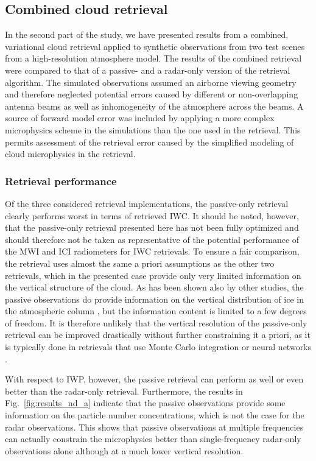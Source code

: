 \documentclass[journal abbreviation, manuscript]{copernicus}
\begin{document}
\subsection{Combined cloud retrieval}

In the second part of the study, we have presented results from a combined,
variational cloud retrieval applied to synthetic observations from two test
scenes from a high-resolution atmosphere model. The results of the combined
retrieval were compared to that of a passive- and a radar-only version of the
retrieval algorithm. The simulated observations assumed an airborne viewing
geometry and therefore neglected potential errors caused by different or
non-overlapping antenna beams as well as inhomogeneity of the atmosphere across
the beams. A source of forward model error was included by applying a more
complex microphysics scheme in the simulations than the one used in the
retrieval. This permits assessment of the retrieval error caused by the
simplified modeling of cloud microphysics in the retrieval.

\subsubsection{Retrieval performance}

Of the three considered retrieval implementations, the passive-only retrieval
clearly performs worst in terms of retrieved IWC. It should be noted, however,
that the passive-only retrieval presented here has not been fully optimized and
should therefore not be taken as representative of the potential performance of
the MWI and ICI radiometers for IWC retrievals. To ensure a fair comparison, the
retrieval uses almost the same a priori assumptions as the other two retrievals,
which in the presented case provide only very limited information on the
vertical structure of the cloud. As has been shown also by other studies, the
passive observations do provide information on the vertical distribution of ice
in the atmospheric column \citep{wang17, grutzun18}, but the information content
is limited to a few degrees of freedom. It is therefore unlikely that the
vertical resolution of the passive-only retrieval can be improved drastically
without further constraining it a priori, as it is typically done in retrievals
that use Monte Carlo integration or neural networks \citep{pfreundschuh18}.

With respect to IWP, however, the passive retrieval can perform as well or even
better than the radar-only retrieval. Furthermore, the results in
Fig.~\ref{fig:results_nd_a} indicate that the passive observations provide some
information on the particle number concentrations, which is not the case for the
radar observations. This shows that passive observations at multiple frequencies
can actually constrain the microphysics better than single-frequency radar-only
observations alone although at a much lower vertical resolution.
\end{document}

